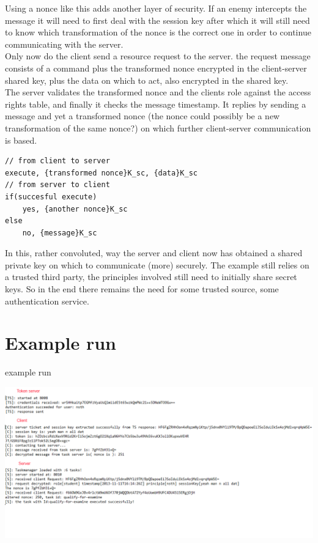 Using a nonce like this adds another layer of security. If an enemy intercepts the message it will need to first deal with the session key after which it will still need to know which transformation of the nonce is the correct one in order to continue communicating with the server. \\

Only now do the client send a resource request to the server. the request message consists of a command plus the transformed nonce encrypted in the client-server shared key, plus the data on which to act, also encrypted in the shared key. \\

The server validates the transformed nonce and the clients role against the access rights table, and finally it checks the message timestamp. It replies by sending a message and yet a transformed nonce (the nonce could possibly be a new transformation of the same nonce?) on which further client-server communication is based.


\begin{lstlisting}
// from client to server
execute, {transformed nonce}K_sc, {data}K_sc
// from server to client
if(succesful execute)
	yes, {another nonce}K_sc
else
	no, {message}K_sc
\end{lstlisting}

In this, rather convoluted, way the server and client now has obtained a shared private key on which to communicate (more) securely. The example still relies on a trusted third party, the principles involved still need to initially share secret keys. So in the end there remains the need for some trusted source, some authentication service. \\
 

\section{Example run}

\begin{center}
\centering
\caption{example run}
\includegraphics[scale=0.5]{images/security_run.png}
\end{center}
\vspace{10pt}

